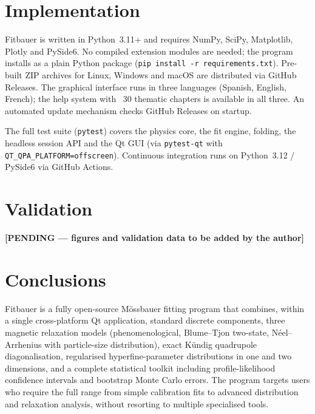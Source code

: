 \documentclass[smallcondensed]{svjour3}
\begin{document}
\section{Implementation}
\label{sec:implementation}

Fitbauer is written in Python~3.11+ and requires NumPy, SciPy, Matplotlib,
Plotly and PySide6. No compiled extension modules are needed; the program
installs as a plain Python package (\texttt{pip install -r requirements.txt}).
Pre-built ZIP archives for Linux, Windows and macOS are distributed via
GitHub Releases. The graphical interface runs in three languages (Spanish,
English, French); the help system with ~30 thematic chapters is available in
all three. An automated update mechanism checks GitHub Releases on startup.

The full test suite (\texttt{pytest}) covers the physics core, the fit
engine, folding, the headless session API and the Qt GUI (via
\texttt{pytest-qt} with \texttt{QT\_QPA\_PLATFORM=offscreen}). Continuous
integration runs on Python~3.12 / PySide6 via GitHub Actions.

\section{Validation}
\label{sec:validation}

%
%
\textbf{[PENDING — figures and validation data to be added by the author]}

\section{Conclusions}
\label{sec:conclusions}

Fitbauer is a fully open-source Mössbauer fitting program that combines,
within a single cross-platform Qt application, standard discrete components,
three magnetic relaxation models (phenomenological, Blume--Tjon two-state,
Néel--Arrhenius with particle-size distribution), exact Kündig quadrupole
diagonalisation, regularised hyperfine-parameter distributions in one and
two dimensions, and a complete statistical toolkit including profile-likelihood
confidence intervals and bootstrap Monte Carlo errors. The program targets
users who require the full range from simple calibration fits to advanced
distribution and relaxation analysis, without resorting to multiple
specialised tools.
\end{document}
